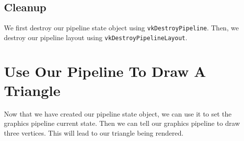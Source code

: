 \subsection{Cleanup}

We first destroy our pipeline state object using \texttt{vkDestroyPipeline}.
Then, we destroy our pipeline layout using \texttt{vkDestroyPipelineLayout}.

\section{Use Our Pipeline To Draw A Triangle}

Now that we have created our pipeline state object, we can use it
to set the graphics pipeline current state.
Then we can tell our graphics pipeline to draw three vertices.
This will lead to our triangle being rendered.

\begin{minipage}{\linewidth}{\noindent}
    
\end{minipage}
